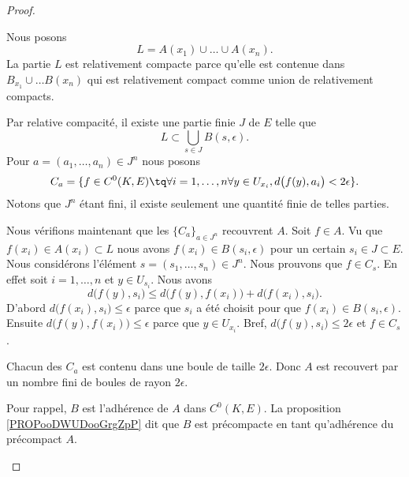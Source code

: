\begin{proof}
\begin{subproof}
\begin{subproof}
			Nous posons
			\begin{equation}
				L=A(x_1)\cup\ldots \cup A(x_n).
			\end{equation}
			La partie \( L\) est relativement compacte parce qu'elle est contenue dans \( B_{x_1}\cup\ldots B(x_n)\) qui est relativement compact comme union de relativement compacts.
			\begin{subproof}

				Par relative compacité, il existe une partie finie \( J\) de \( E\) telle que
				\begin{equation}
					L\subset \bigcup_{s\in J}B(s,\epsilon).
				\end{equation}
				Pour \( a=(a_1,\ldots,a_n)\in J^n\) nous posons
				\begin{equation}
					C_a=\{ f\in C^0(K,E)\tq \forall i=1,\ldots,n\forall y\in U_{x_i},d\big( f(y),a_i \big)<2\epsilon \}.
				\end{equation}
				Notons que \( J^n\) étant fini, il existe seulement une quantité finie de telles parties.

				Nous vérifions maintenant que les \( \{ C_a \}_{a\in J^n}\) recouvrent \( A\). Soit \( f\in A\). Vu que \( f(x_i)\in A(x_i)\subset L\) nous avons \( f(x_i)\in B(s_i,\epsilon)\) pour un certain \( s_i\in J\subset E\). Nous considérons l'élément \( s=(s_1,\ldots,s_n)\in J^n\). Nous prouvons que \( f\in C_s\). En effet soit \( i=1,\ldots,n\) et \( y\in U_{s_i}\). Nous avons
				\begin{equation}
					d\big( f(y),s_i \big)\leq d\big( f(y),f(x_i) \big)+d\big( f(x_i),s_i \big).
				\end{equation}
				D'abord \( d\big( f(x_i),s_i \big)\leq \epsilon\) parce que \( s_i\) a été choisit pour que \( f(x_i)\in B(s_i,\epsilon)\). Ensuite \( d\big( f(y),f(x_i) \big)\leq\epsilon\) parce que \( y\in U_{x_i}\). Bref, \( d\big( f(y),s_i \big)\leq 2\epsilon\) et \( f\in C_s\).

				Chacun des \( C_a\) est contenu dans une boule de taille \( 2\epsilon\). Donc \( A\) est recouvert par un nombre fini de boules de rayon \( 2\epsilon\).

			\end{subproof}
			Pour rappel, \( B\) est l'adhérence de \( A\) dans \( C^0(K,E)\). La proposition \ref{PROPooDWUDooGrgZpP} dit que \( B\) est précompacte en tant qu'adhérence du précompact \( A\).


\end{subproof}
\end{subproof}
\end{proof}
